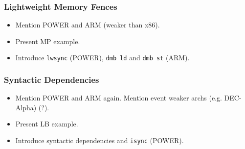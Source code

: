 \subsubsection{Lightweight Memory Fences}

\begin{itemize}
  \item Mention POWER and ARM (weaker than x86).
  \item Present MP example. 
  \item Introduce \texttt{lwsync} (POWER), \texttt{dmb ld} and \texttt{dmb st} (ARM).
\end{itemize}

\subsubsection{Syntactic Dependencies}

\begin{itemize}
  \item Mention POWER and ARM again. Mention event weaker archs (e.g. DEC-Alpha) (?).
  \item Present LB example. 
  \item Introduce syntactic dependencies and \texttt{isync} (POWER).
\end{itemize}





